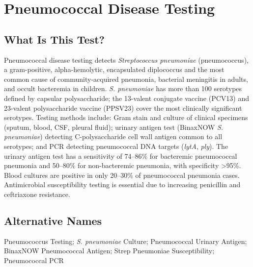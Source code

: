 \chapter{Pneumococcal Disease Testing}

\section*{What Is This Test?}
Pneumococcal disease testing detects \textit{Streptococcus pneumoniae} (pneumococcus), a gram-positive, alpha-hemolytic, encapsulated diplococcus and the most common cause of community-acquired pneumonia, bacterial meningitis in adults, and occult bacteremia in children. \textit{S. pneumoniae} has more than 100 serotypes defined by capsular polysaccharide; the 13-valent conjugate vaccine (PCV13) and 23-valent polysaccharide vaccine (PPSV23) cover the most clinically significant serotypes. Testing methods include: Gram stain and culture of clinical specimens (sputum, blood, CSF, pleural fluid); urinary antigen test (BinaxNOW \textit{S. pneumoniae}) detecting C-polysaccharide cell wall antigen common to all serotypes; and PCR detecting pneumococcal DNA targets (\textit{lytA}, \textit{ply}). The urinary antigen test has a sensitivity of 74--86\% for bacteremic pneumococcal pneumonia and 50--80\% for non-bacteremic pneumonia, with specificity >95\%. Blood cultures are positive in only 20--30\% of pneumococcal pneumonia cases. Antimicrobial susceptibility testing is essential due to increasing penicillin and ceftriaxone resistance.

\section*{Alternative Names}
Pneumococcus Testing; \textit{S. pneumoniae} Culture; Pneumococcal Urinary Antigen; BinaxNOW Pneumococcal Antigen; Strep Pneumoniae Susceptibility; Pneumococcal PCR

